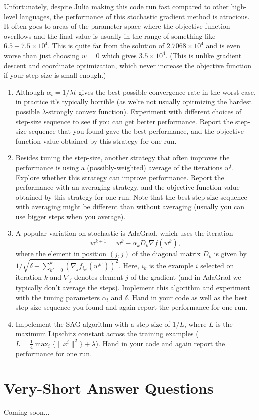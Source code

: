 \documentclass{article}
\def\blu#1{{\color{blu}#1}}
\def\norm#1{\|#1\|}
\def\enum#1{\begin{enumerate}#1\end{enumerate}}
\begin{document}
Unfortunately, despite Julia making this code run fast compared to other high-level languages, the performance of this stochastic gradient method is atrocious. It often goes to areas of the parameter space where the objective function overflows and the final value is usually in the range of something like $6.5-7.5 \times 10^4$. This is quite far from the solution of $2.7068 \times 10^4$ and is even worse than just choosing $w=0$ which gives $3.5 \times 10^4$. (This is unlike gradient descent and coordinate optimization, which never increase the objective function if your step-size is small enough.)

\enum{
\item Although $\alpha_t = 1/\lambda t$ gives the best possible convergence rate in the worst case, in practice it's typically horrible (as we're not usually opitmizing the hardest possible $\lambda$-strongly convex function). Experiment with different choices of step-size sequence to see if you can get better performance. \blu{Report the step-size sequence that you found gave the best performance, and the objective function value obtained by this strategy for one run}.
\item Besides tuning the step-size, another strategy that often improves the performance is using a (possibly-weighted) average of the iterations $w^t$. Explore whether this strategy can improve performance.  \blu{Report the performance with an averaging strategy, and the objective function value obtained by this strategy for one run}. Note that the best step-size sequence with averaging might be different than without averaging (usually you can use bigger steps when you average).
\item A popular variation on stochastic is AdaGrad, which uses the iteration
\[
w^{k+1} = w^k - \alpha_k D_k \nabla f(w^k),
\]
where the element in position $(j,j)$ of the diagonal matrix $D_k$ is given by $1/\sqrt{\delta + \sum_{k'=0}^k(\nabla_j f_{i_{k'}}(w^{k'}))^2}$. Here, $i_k$ is the example $i$ selected on iteration $k$ and $\nabla_j$ denotes element $j$ of the gradient (and in AdaGrad we typically don't average the steps).  Implement this algorithm and experiment with the tuning parameters $\alpha_t$ and $\delta$. \blu{Hand in your code as well as the best step-size sequence you found and again report the performance for one run}.
\item Impelement the SAG algorithm with a step-size of $1/L$, where $L$ is the maximum Lipschitz constant across the training examples ($L = \frac{1}{4}\max_i\{\norm{x^i}^2\} + \lambda$).  \blu{Hand in your code and again report the performance for one run}.
}

\section{Very-Short Answer Questions}

Coming soon...



 
\end{document}
